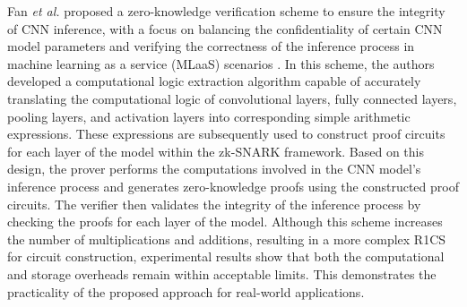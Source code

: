 \documentclass[journal]{IEEEtran}
\begin{document}
Fan \emph{et al.} proposed a zero-knowledge verification scheme to ensure the integrity of CNN inference, with a focus on balancing the confidentiality of certain CNN model parameters and verifying the correctness of the inference process in machine learning as a service (MLaaS) scenarios \cite{fan2023validating}. In this scheme, the authors developed a computational logic extraction algorithm capable of accurately translating the computational logic of convolutional layers, fully connected layers, pooling layers, and activation layers into corresponding simple arithmetic expressions. These expressions are subsequently used to construct proof circuits for each layer of the model within the zk-SNARK framework. Based on this design, the prover performs the computations involved in the CNN model's inference process and generates zero-knowledge proofs using the constructed proof circuits. The verifier then validates the integrity of the inference process by checking the proofs for each layer of the model. Although this scheme increases the number of multiplications and additions, resulting in a more complex R1CS for circuit construction, experimental results show that both the computational and storage overheads remain within acceptable limits. This demonstrates the practicality of the proposed approach for real-world applications.
\end{document}
